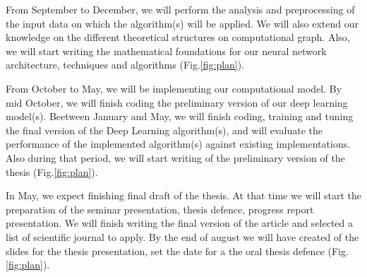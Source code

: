 \documentclass[12pt]{article}
\begin{document}
From September to December, we will perform the analysis and preprocessing of the input data on which the algorithm(s) will be applied. We will also extend our knowledge on the different theoretical structures on computational graph. Also, we will start writing the mathematical foundations for our neural network architecture, techniques and algorithms (Fig.\ref{fig:plan}). 

From October to May, we will be implementing our computational model. By mid October, we will finish coding the preliminary version of our deep learning model(s). Beetween January and May, we will finish coding, training and tuning the final version of the Deep Learning algorithm(s), and will evaluate the performance of the implemented algorithm(s) against existing implementations. Also during that period, we will start writing of the preliminary version of the thesis (Fig.\ref{fig:plan}).

In May, we expect finishing final draft of the thesis. At that time we will start the preparation of the seminar presentation, thesis defence, progress report presentation. We will finish writing the final version of the article and selected a list of scientific journal to apply. By the end of august we will have created of the slides for the thesis presentation, set the date for a the oral thesis defence (Fig.\ref{fig:plan}). 

\printbibliography[title={Bibliography},nottype=misc,resetnumbers=true]
\end{document}
